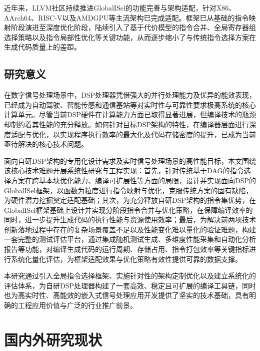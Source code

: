 近年来，LLVM社区持续推进GlobalISel的功能完善与架构适配，针对X86、AArch64、RISC-V以及AMDGPU等主流架构已完成适配。框架已从基础的指令映射阶段演进至深度优化阶段，陆续引入了基于代价模型的指令合并、全局寄存器组选择策略以及指令局部性优化等关键功能，从而逐步缩小了与传统指令选择方案在生成代码质量上的差距。


\subsection{研究意义}
在数字信号处理场景中，DSP处理器凭借强大的并行处理能力及优异的能效表现，已经成为自动驾驶、智能传感和通信基站等对实时性与可靠性要求极高系统的核心计算单元。尽管当前DSP硬件在计算能力方面已取得显著进展，但编译技术的瓶颈却制约着其性能的充分释放。如何针对目标DSP架构的特性，在编译器层面进行深度适配与优化，以实现程序执行效率的最大化及代码存储密度的提升，已成为当前亟待解决的核心技术问题。

\par

面向自研DSP架构的专用化设计需求及实时信号处理场景的高性能目标，本文围绕该核心技术难题开展系统性研究与工程实现：首先，针对传统基于DAG的指令选择方案在跨基本块优化能力、编译可扩展性等方面的局限，设计并实现面向DSP的GlobalISel框架，以函数为粒度进行指令映射与优化，克服传统方案的固有缺陷，为硬件潜力挖掘奠定适配基础；其次，为充分释放自研DSP架构的指令集优势，在GlobalISel框架基础上设计并实现分阶段指令合并与优化策略，在保障编译效率的同时，进一步提升生成代码的执行性能与资源使用效率；最后，为解决前两项技术创新落地过程中存在的复杂场景覆盖不足以及性能变化难以量化的验证难题，构建一套完整的测试评估平台，通过集成随机测试生成、多维度性能采集和自动化分析报告等功能，对编译生成代码的运行周期、存储占用、指令打包效率等关键指标进行系统化量化评估，为框架适配效果与优化策略有效性提供可靠的数据支撑。

\par

本研究通过引入全局指令选择框架、实施针对性的架构定制优化以及建立系统化的评估体系，为自研DSP处理器构建了一套高效、稳定且可扩展的编译工具链，同时也为高实时性、高能效的嵌入式信号处理应用开发提供了坚实的技术基础，具有明确的工程应用价值与广泛的行业推广前景。


\section{国内外研究现状}


